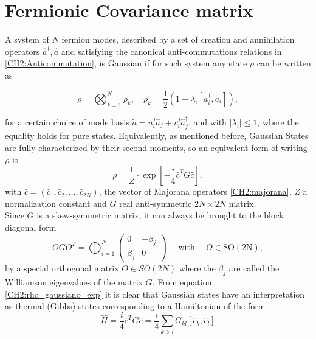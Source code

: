 \section{Fermionic Covariance matrix }
A system of $N$ fermion modes, described by a set of creation and annihilation operators $\hat{a}^{\dagger}, \hat{a}$  and satisfying the  canonical anti-commutations relations in \eqref{CH2:Anticommutation}, is Gaussian if for such system any state $\rho$ can be written as  \cite{cheong_many-body_2003}

\begin{equation}
\rho=\bigotimes_{k=1}^{N} \tilde{\rho}_{k}, \quad \tilde{\rho}_{k}=\frac{1}{2}\left(1-\lambda_{i}\left[\tilde{a}_{i}^{\dagger}, \tilde{a}_{i}\right]\right),
\label{CH2:rho_gaussiano_no_exp}
\end{equation}

for a certain choice of mode basis $\tilde{a}=u_{i}^{j}\hat{a}_{j} + v_{i}^{j}\hat{a}_{j}^{\dagger}$, and with $|\lambda_i|\leq 1$, where the equality holds for pure states. Equivalently, as mentioned before, Gaussian States are fully characterized by their second moments, so an equivalent form of writing $\rho$ is
\begin{equation}
\rho= \frac{1}{Z}\cdot \exp \left[-\frac{i}{4} \hat{c}^{T} G \hat{c}\right],
\label{CH2:rho_gaussiano_exp}
\end{equation}
with $\hat{c} = (\hat{c}_1,\hat{c}_2,\ldots,\hat{c}_{2N})$, the vector of Majorana operators \eqref{CH2:majorana}, $Z$ a normalization constant and $G$ real anti-symmetric $2N\times 2N$ matrix. 
\\
Since $G$ is a skew-symmetric matrix, it can always be brought to the block diagonal form 
\begin{equation}
O G O^{T}=\bigoplus_{i=1}^{N}\left(\begin{array}{cc}
0 & -\beta_{j} \\
\beta_{j} & 0
\end{array}\right) \quad \text { with } \quad O \in \mathrm{SO}(2 \mathrm{N}),
\label{CH2:MatrixG_Williamson}
\end{equation}
by a special orthogonal matrix $O\in SO(2N)$ where the $\beta_{j}$ are called the Williamson eigenvalues of the matrix $G$. 
From equation \eqref{CH2:rho_gaussiano_exp} it is clear that Gaussian states have an interpretation as thermal (Gibbs) states corresponding to a Hamiltonian of the form
\begin{equation}
\hat{H}=\frac{i}{4} \hat{c}^{T}G\hat{c}= \frac{i}{4} \sum_{k>l}G_{kl}\left[\hat{c}_{k},\hat{c}_{l}\right]
\label{CH2:Hamiltonian_majorana}
\end{equation}

